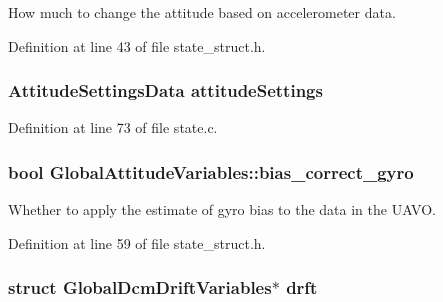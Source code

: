 \-How much to change the attitude based on accelerometer data. 



\-Definition at line 43 of file state\-\_\-struct.\-h.

\hypertarget{group___state_estimation_filters_ga8f6543ab52bafea6c0858baeeae8db59}{
\subsubsection[{attitude\-Settings}]{\setlength{\rightskip}{0pt plus 5cm}\-Attitude\-Settings\-Data {\bf attitude\-Settings}}}\label{group___state_estimation_filters_ga8f6543ab52bafea6c0858baeeae8db59}


\-Definition at line 73 of file state.\-c.

\hypertarget{group___state_estimation_filters_ga3df4e05bd900b439ad746cbadce667d5}{
\subsubsection[{bias\-\_\-correct\-\_\-gyro}]{\setlength{\rightskip}{0pt plus 5cm}bool {\bf \-Global\-Attitude\-Variables\-::bias\-\_\-correct\-\_\-gyro}}}\label{group___state_estimation_filters_ga3df4e05bd900b439ad746cbadce667d5}


\-Whether to apply the estimate of gyro bias to the data in the \-U\-A\-V\-O. 



\-Definition at line 59 of file state\-\_\-struct.\-h.

\hypertarget{group___state_estimation_filters_ga89657be5e41cdb8b74d42e587333115a}{
\subsubsection[{drft}]{\setlength{\rightskip}{0pt plus 5cm}struct {\bf \-Global\-Dcm\-Drift\-Variables}$\ast$ {\bf drft}}}\label{group___state_estimation_filters_ga89657be5e41cdb8b74d42e587333115a}


